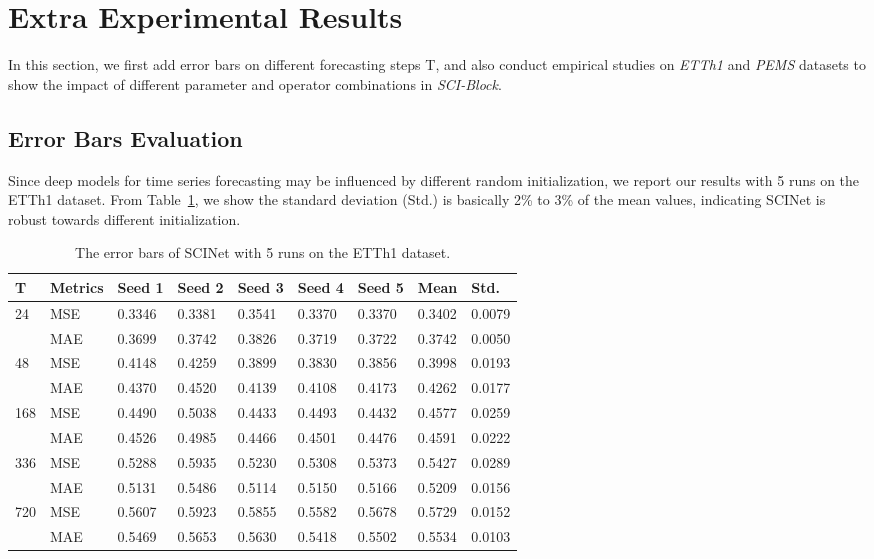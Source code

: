 \documentclass{article}
\begin{document}
\section{Extra Experimental Results}
\label{sec:extra_results}
In this section, we first add error bars on different forecasting steps T, and also conduct  empirical studies on \emph{ETTh1} and \emph{PEMS} datasets to show the impact of different parameter and operator combinations in \emph{SCI-Block}.



\subsection{Error Bars Evaluation}
Since deep models for time series forecasting may be influenced by different random initialization, we report our results with 5 runs on the ETTh1 dataset. From Table~\ref{tab:supp_bar}, we show the standard deviation (Std.) is basically 2\% to 3\% of the mean values, indicating SCINet is robust towards different initialization.


\begin{table}[!ht]
    \centering
    \caption{The error bars of SCINet with 5 runs on the ETTh1 dataset.}
    \begin{tabular}{l|l|l|l|l|l|l|l|l}
    \hline
        T & Metrics & Seed 1 & Seed 2 & Seed 3 & Seed 4 & Seed 5 & Mean & Std. \\ \hline
        24 & MSE & 0.3346 & 0.3381 & 0.3541 & 0.3370 & 0.3370 & 0.3402 & 0.0079 \\ 
        ~ & MAE & 0.3699 & 0.3742 & 0.3826 & 0.3719 & 0.3722 & 0.3742 & 0.0050 \\ \hline
        48 & MSE & 0.4148 & 0.4259 & 0.3899 & 0.3830 & 0.3856 & 0.3998 & 0.0193 \\ 
        ~ & MAE & 0.4370 & 0.4520 & 0.4139 & 0.4108 & 0.4173 & 0.4262 & 0.0177 \\ \hline
        168 & MSE & 0.4490 & 0.5038 & 0.4433 & 0.4493 & 0.4432 & 0.4577 & 0.0259 \\ 
        ~ & MAE & 0.4526 & 0.4985 & 0.4466 & 0.4501 & 0.4476 & 0.4591 & 0.0222 \\ \hline
        336 & MSE & 0.5288 & 0.5935 & 0.5230 & 0.5308 & 0.5373 & 0.5427 & 0.0289 \\ 
        ~ & MAE & 0.5131 & 0.5486 & 0.5114 & 0.5150 & 0.5166 & 0.5209 & 0.0156 \\ \hline
        720 & MSE & 0.5607 & 0.5923 & 0.5855 & 0.5582 & 0.5678 & 0.5729 & 0.0152 \\ 
        ~ & MAE & 0.5469 & 0.5653 & 0.5630 & 0.5418 & 0.5502 & 0.5534 & 0.0103 \\ \hline
    \end{tabular}
    \label{tab:supp_bar}
\end{table}
\end{document}
